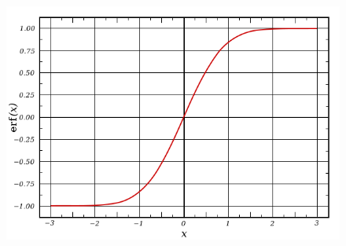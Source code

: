 \documentclass[10pt]{article}
\begin{document}
\begin{figure}[H]
\begin{center}
\includegraphics[scale=0.5]{images/GaussErrorFunction.png}
\end{center}
\end{figure}

\begin{thebibliography}{1}



\end{thebibliography}
\end{document}
